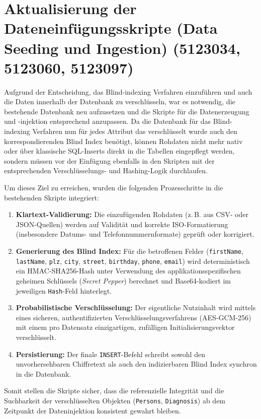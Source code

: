 \section{Aktualisierung der Dateneinfügungsskripte (Data Seeding und Ingestion) (5123034, 5123060, 5123097)}
Aufgrund der Entscheidung, das Blind-indexing Verfahren einzuführen und auch die Daten innerhalb der Datenbank zu verschlüsseln, war es notwendig, die bestehende 
Datenbank neu aufzusetzen und die Skripte für die Datenerzeugung und -injektion entsprechend anzupassen. 
Da die Datenbank für das Blind-indexing Verfahren nun für jedes Attribut das verschlüsselt wurde auch den korrespondierenden Blind Index benötigt, können Rohdaten 
nicht mehr nativ oder über klassische SQL-Inserts direkt in die Tabellen eingepflegt werden, sondern müssen vor der Einfügung ebenfalls in den Skripten mit der entsprechenden 
Verschlüsselungs- und Hashing-Logik durchlaufen.

Um dieses Ziel zu erreichen, wurden die folgenden Prozesschritte in die bestehenden Skripte integriert: 

\begin{enumerate}
    \item \textbf{Klartext-Validierung:} Die einzufügenden Rohdaten (z.\,B. aus CSV- oder JSON-Quellen) werden auf Validität 
    und korrekte ISO-Formatierung (insbesondere Datums- und Telefonnummernformate) geprüft oder korrigiert.
    \item \textbf{Generierung des Blind Index:} Für die betroffenen Felder (\texttt{firstName}, 
    \texttt{lastName}, \texttt{plz}, \texttt{city}, \texttt{street}, \texttt{birthday}, \texttt{phone}, \texttt{email}) wird 
    deterministisch ein HMAC-SHA256-Hash unter Verwendung des applikationsspezifischen geheimen Schlüssels (\textit{Secret Pepper}) berechnet 
    und Base64-kodiert im jeweiligen \texttt{Hash}-Feld hinterlegt.
    \item \textbf{Probabilistische Verschlüsselung:} Der eigentliche Nutzinhalt wird mittels eines sicheren, authentifizierten Verschlüsselungsverfahrens 
    (AES-GCM-256) mit einem pro Datensatz einzigartigen, zufälligen Initialisierungsvektor verschlüsselt.
    \item \textbf{Persistierung:} Der finale \texttt{INSERT}-Befehl schreibt sowohl den unvorhersehbaren Chiffretext als auch den 
    indizierbaren Blind Index synchron in die Datenbank.
\end{enumerate}


Somit stellen die Skripte sicher, dass die referenzielle Integrität und die Suchbarkeit der verschlüsselten Objekten (\texttt{Persons}, \texttt{Diagnosis}) ab dem 
Zeitpunkt der Dateninjektion konsistent gewahrt bleiben.